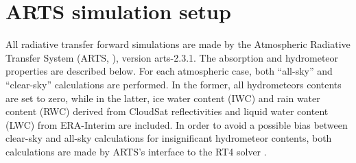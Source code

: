 \documentclass[amt, manuscript]{copernicus}
\begin{document}











\appendix
\section{ARTS simulation setup}    %
\label{appendix:ARTS_setup}
%
All radiative transfer forward simulations are made by the Atmospheric Radiative
Transfer System (ARTS, \citet{eriksson:arts2:11,buehler:artst:18}), version
arts-2.3.1. The absorption and hydrometeor properties are described below. For each atmospheric case, both ``all-sky'' and ``clear-sky'' calculations are performed. In the former, all hydrometeors contents are set to zero, while in the latter, ice water content (IWC) and rain water content (RWC) derived from CloudSat reflectivities and liquid water content (LWC) from ERA-Interim \citep{dee2011erainterim} are included. In order to avoid a possible bias between clear-sky and all-sky calculations for insignificant hydrometeor contents, both calculations are made by ARTS's interface to the RT4 solver \citep{evans1995microwavec}.
\end{document}
